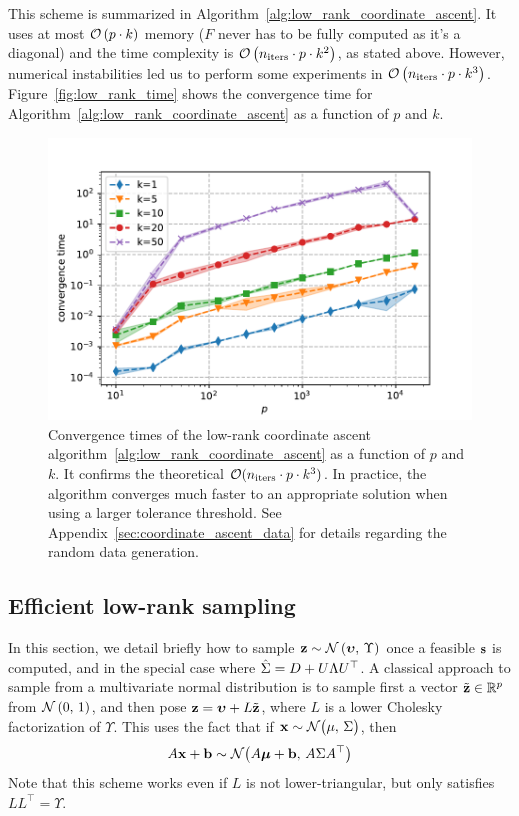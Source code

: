 This scheme is summarized in Algorithm~\ref{alg:low_rank_coordinate_ascent}.
It uses at most $\mathcal{O}\left( p \cdot k \right)$ memory ($F$ never has to be fully computed as it's a diagonal)
and the time complexity is $\mathcal{O}\left( n_\text{iters} \cdot p \cdot k^2 \right)$, as stated above.
However, numerical instabilities led us to perform some experiments in $\mathcal{O}\left( n_\text{iters} \cdot p \cdot k^3 \right)$.
Figure~\ref{fig:low_rank_time} shows the convergence time for Algorithm~\ref{alg:low_rank_coordinate_ascent} as
a function of $p$ and $k$.
\begin{figure}
    \centering
    \includegraphics[width=0.8\linewidth, height=0.5\linewidth]{figures/low_rank_times.pdf}
    \caption{
        Convergence times of the low-rank coordinate ascent algorithm~\ref{alg:low_rank_coordinate_ascent}
        as a function of $p$ and $k$.
        It confirms the theoretical $\mathcal{O}(n_{\text{iters}} \cdot p \cdot k^3)$.
        In practice,
        the algorithm converges much faster to an appropriate solution when using a larger tolerance threshold.
        See Appendix~\ref{sec:coordinate_ascent_data} for details regarding the random data generation.
    }
    \label{fig:low_rank_times}
\end{figure}

\subsection{Efficient low-rank sampling}\label{subsec:low_rank_sampling}

In this section, we detail briefly how to sample $\mathbf{z} \sim \mathcal{N}\left( \bm{\upsilon},\, \Upsilon \right)$ once
a feasible $\mathbf{s}$ is computed, and in the special case where $\hat{\Sigma} = D + U\Lambda U^\top$.
A classical approach to sample from a multivariate normal distribution is to sample first a vector
$\tilde{\mathbf{z}} \in \mathbb{R}^p$ from $\mathcal{N}\left( 0,\, 1 \right)$,
and then pose $\mathbf{z} = \bm{\upsilon} + L\tilde{\mathbf{z}}$,
where $L$ is a lower Cholesky factorization of $\Upsilon$.
This uses the fact that if $\mathbf{x} \sim \mathcal{N}\big( \mu,\, \Sigma \big)$,
then
\begin{equation}\label{eq:affine_transformation}
    A\mathbf{x} + \mathbf{b} \sim \mathcal{N}\big( A\bm{\mu} + \mathbf{b},\, A\Sigma A^\top \big)
\end{equation}
Note that this scheme works even if $L$ is not lower-triangular,
but only satisfies $LL^\top = \Upsilon$.

